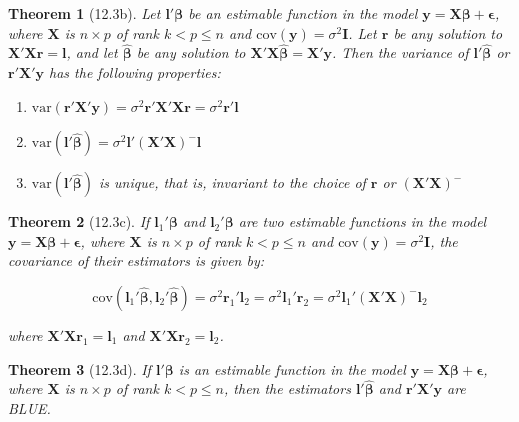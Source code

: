 \documentclass{article}
\newtheorem{theorem}{Theorem}[section]
\begin{document}
\begin{theorem}[12.3b]
Let $\mathbf{l}'\boldsymbol{\beta}$ be an estimable function in the model $\mathbf{y} = \mathbf{X}\boldsymbol{\beta} + \boldsymbol{\epsilon}$, where $\mathbf{X}$ is $n \times p$ of rank $k < p \leq n$ and $\text{cov}(\mathbf{y}) = \sigma^2\mathbf{I}$. Let $\mathbf{r}$ be any solution to $\mathbf{X}'\mathbf{X}\mathbf{r} = \mathbf{l}$, and let $\hat{\boldsymbol{\beta}}$ be any solution to $\mathbf{X}'\mathbf{X}\hat{\boldsymbol{\beta}} = \mathbf{X}'\mathbf{y}$. Then the variance of $\mathbf{l}'\hat{\boldsymbol{\beta}}$ or $\mathbf{r}'\mathbf{X}'\mathbf{y}$ has the following properties:

\begin{enumerate}[label=(\roman*)]
\item $\text{var}(\mathbf{r}'\mathbf{X}'\mathbf{y}) = \sigma^2\mathbf{r}'\mathbf{X}'\mathbf{X}\mathbf{r} = \sigma^2\mathbf{r}'\mathbf{l}$
\item $\text{var}(\mathbf{l}'\hat{\boldsymbol{\beta}}) = \sigma^2\mathbf{l}'(\mathbf{X}'\mathbf{X})^{-}\mathbf{l}$
\item $\text{var}(\mathbf{l}'\hat{\boldsymbol{\beta}})$ is unique, that is, invariant to the choice of $\mathbf{r}$ or $(\mathbf{X}'\mathbf{X})^{-}$
\end{enumerate}
\end{theorem}

\begin{theorem}[12.3c]
If $\mathbf{l}_1'\boldsymbol{\beta}$ and $\mathbf{l}_2'\boldsymbol{\beta}$ are two estimable functions in the model $\mathbf{y} = \mathbf{X}\boldsymbol{\beta} + \boldsymbol{\epsilon}$, where $\mathbf{X}$ is $n \times p$ of rank $k < p \leq n$ and $\text{cov}(\mathbf{y}) = \sigma^2\mathbf{I}$, the covariance of their estimators is given by:

\[\text{cov}(\mathbf{l}_1'\hat{\boldsymbol{\beta}}, \mathbf{l}_2'\hat{\boldsymbol{\beta}}) = \sigma^2\mathbf{r}_1'\mathbf{l}_2 = \sigma^2\mathbf{l}_1'\mathbf{r}_2 = \sigma^2\mathbf{l}_1'(\mathbf{X}'\mathbf{X})^{-}\mathbf{l}_2\]

where $\mathbf{X}'\mathbf{X}\mathbf{r}_1 = \mathbf{l}_1$ and $\mathbf{X}'\mathbf{X}\mathbf{r}_2 = \mathbf{l}_2$.
\end{theorem}

\begin{theorem}[12.3d]
If $\mathbf{l}'\boldsymbol{\beta}$ is an estimable function in the model $\mathbf{y} = \mathbf{X}\boldsymbol{\beta} + \boldsymbol{\epsilon}$, where $\mathbf{X}$ is $n \times p$ of rank $k < p \leq n$, then the estimators $\mathbf{l}'\hat{\boldsymbol{\beta}}$ and $\mathbf{r}'\mathbf{X}'\mathbf{y}$ are BLUE.
\end{theorem}
\end{document}
